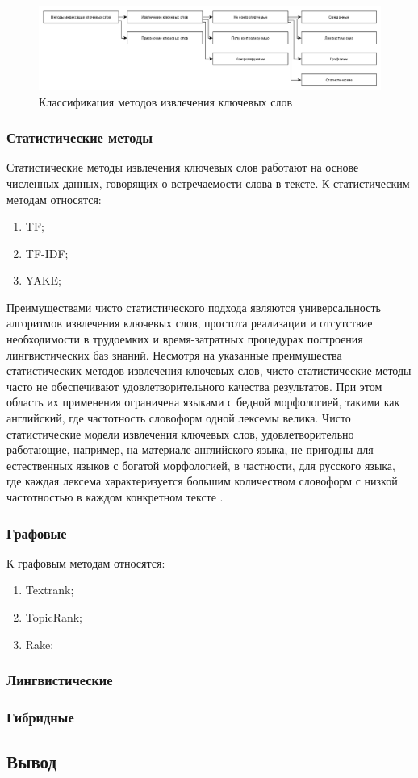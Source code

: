\begin{figure}[H]
	\centering
	\includegraphics[width=0.7\linewidth]{src/img/ke_types}
	\caption[]{Классификация методов извлечения ключевых слов}
	\label{fig:ketypes}
\end{figure}

\subsubsection{Статистические методы}
Статистические методы извлечения ключевых слов работают на основе численных данных, говорящих о встречаемости слова в тексте.
К статистическим методам относятся:
\begin{enumerate}
	\item TF;
	\item TF-IDF;
	\item YAKE;
\end{enumerate}

Преимуществами чисто статистического подхода являются универсальность алгоритмов извлечения ключевых слов, простота реализации и отсутствие необходимости в трудоемких и время-затратных процедурах построения лингвистических баз знаний.
Несмотря на указанные преимущества статистических методов извлечения ключевых слов, чисто статистические методы часто не обеспечивают удовлетворительного качества результатов. 
При этом область их применения ограничена языками с бедной морфологией, такими как английский, где частотность словоформ одной лексемы велика. 
Чисто статистические модели извлечения ключевых слов, удовлетворительно работающие, например, на материале английского языка, не пригодны для естественных языков с богатой морфологией, в частности, для русского языка, где каждая лексема характеризуется большим количеством словоформ с низкой частотностью в каждом конкретном тексте \cite{9}.

\subsubsection{Графовые}

К графовым методам относятся:
\begin{enumerate}
	\item Textrank;
	\item TopicRank;
	\item Rake;
\end{enumerate}

\subsubsection{Лингвистические}
\subsubsection{Гибридные}
\subsection{Вывод}
